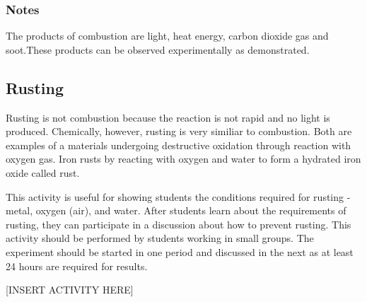 \subsubsection*{Notes}
The products of combustion are light, heat energy, carbon dioxide gas and soot.These products can be observed experimentally as demonstrated.

\subsection{Rusting}

Rusting is not combustion because the reaction is not rapid and no light is produced. Chemically, however, rusting is very similiar to combustion. Both are examples of a materials undergoing destructive oxidation through reaction with oxygen gas. Iron rusts by reacting with oxygen and water to form a hydrated iron oxide called rust.

This activity is useful for showing students the conditions required for rusting - metal, oxygen (air), and water. After students learn about the requirements of rusting, they can participate in a discussion about how to prevent rusting. This activity should be performed by students working in small groups. The experiment should be started in one period and discussed in the next as at least 24 hours are required for results.

[INSERT ACTIVITY HERE]
